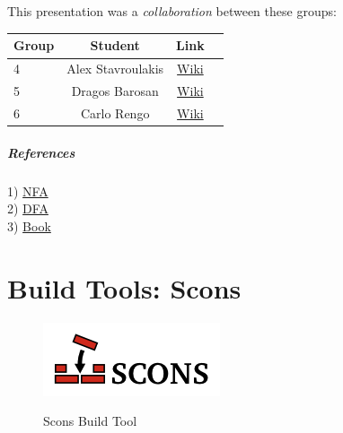 \documentclass[a4paper,11pt]{report}
\begin{document}
\paragraph{}
This presentation was a \emph{collaboration} between these groups: \\

\begin{center}
 \begin{tabular}{| l | c | c | c |}
 \hline \textbf{Group} & \textbf{Student} & \textbf{Link} \\
 \hline 
 4 & Alex Stavroulakis & \href{https://www.os3.nl/2014-2015/students/alexandros_stavroulakis/es}{Wiki}\\
 \hline 
 5 & Dragos Barosan & \href{https://www.os3.nl/2014-2015/students/dragos_barosan/es/week2#homework_3}{Wiki} \\ 
 \hline 
 6 & Carlo Rengo & \href{https://www.os3.nl/2014-2015/students/carlo_rengo/es/homewrk_3}{Wiki} \\ 
 \hline 
 \end{tabular} 
\end{center}


\paragraph{References\\}
1) \href{http://en.wikipedia.org/wiki/Nondeterministic_finite_automaton}{NFA} \\
2) \href{http://en.wikipedia.org/wiki/Deterministic_finite_automaton}{DFA} \\
3) \href{http://dl.e-book-free.com/2013/07/mastering_regular_expressions_third_edition.pdf}{Book} \\

\chapter {Build Tools: Scons}

\begin{figure}[h]
	\centering
		\includegraphics{images/scons-logo-transparent.png}~\\[1cm]
		\caption{Scons Build Tool}
\end{figure}
\end{document}
